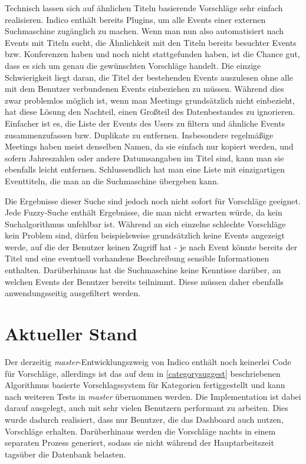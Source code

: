 Technisch lassen sich auf ähnlichen Titeln basierende Vorschläge sehr einfach realisieren. Indico
enthält bereits Plugins, um alle Events einer externen Suchmaschine zugänglich zu machen. Wenn man
nun also automatisiert nach Events mit Titeln sucht, die Ähnlichkeit mit den Titeln bereits
besuchter Events bzw. Konferenzen haben und noch nicht stattgefunden haben, ist die Chance gut, dass
es sich um genau die gewünschten Vorschläge handelt. Die einzige Schwierigkeit liegt daran, die
Titel der bestehenden Events auszulesen ohne alle mit dem Benutzer verbundenen Events einbeziehen zu
müssen. Während dies zwar problemlos möglich ist, wenn man Meetings grundsätzlich nicht einbezieht,
hat diese Lösung den Nachteil, einen Großteil des Datenbestandes zu ignorieren. Einfacher ist es,
die Liste der Events des Users zu filtern und ähnliche Events zusammenzufassen bzw. Duplikate zu
entfernen. Insbesondere regelmäßige Meetings haben meist denselben Namen, da sie einfach nur kopiert
werden, und sofern Jahreszahlen oder andere Datumsangaben im Titel sind, kann man sie ebenfalls
leicht entfernen. Schlussendlich hat man eine Liste mit einzigartigen Eventtiteln, die man an die
Suchmaschine übergeben kann.

Die Ergebnisse dieser Suche sind jedoch noch nicht sofort für Vorschläge geeignet. Jede Fuzzy-Suche
enthält Ergebnisse, die man nicht erwarten würde, da kein Suchalgorithmus unfehlbar ist. Während an
sich einzelne schlechte Vorschläge kein Problem sind, dürfen beispielsweise grundsätzlich keine
Events angezeigt werde, auf die der Benutzer keinen Zugriff hat - je nach Event könnte bereits
der Titel und eine eventuell vorhandene Beschreibung sensible Informationen enthalten. Darüberhinaus
hat die Suchmaschine keine Kenntisse darüber, an welchen Events der Benutzer bereits teilnimmt.
Diese müssen daher ebenfalls anwendungsseitig ausgefiltert werden.


\section{Aktueller Stand}

Der derzeitig \emph{master}-Entwicklungszweig von Indico enthält noch keinerlei Code für Vorschläge,
allerdings ist das auf dem in \autoref{categorysuggest} beschriebenen Algorithmus basierte
Vorschlagssystem für Kategorien fertiggestellt und kann nach weiteren Tests in \emph{master}
übernommen werden. Die Implementation ist dabei darauf ausgelegt, auch mit sehr vielen Benutzern
performant zu arbeiten.  Dies wurde dadurch realisiert, dass nur Benutzer, die das Dashboard auch
nutzen, Vorschläge erhalten. Darüberhinaus werden die Vorschläge nachts in einem separaten Prozess
generiert, sodass sie nicht während der Hauptarbeitszeit tagsüber die Datenbank belasten.


